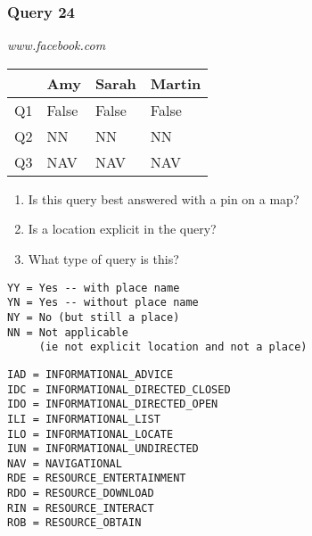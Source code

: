 \begin{frame}[fragile]
\frametitle{Query 24}
\vspace{1em}

\emph{www.facebook.com}

\vfill

\begin{table}
  \centering
  \begin{tabular}{ l l l l }
    & \textbf{Amy} & \textbf{Sarah} & \textbf{Martin}\\
    \toprule
    Q1 & False & False & False\\
Q2 & NN & NN & NN\\
Q3 & NAV & NAV & NAV\\
    \bottomrule
  \end{tabular}
\end{table}

\vfill

\tiny{

\begin{enumerate}
\item Is this query best answered with a pin on a map?
\item Is a location explicit in the query?
\item What type of query is this?
\end{enumerate}

\vfill

\begin{multicols}{2}
\begin{verbatim}
YY = Yes -- with place name
YN = Yes -- without place name
NY = No (but still a place)
NN = Not applicable 
     (ie not explicit location and not a place)
\end{verbatim}

\columnbreak
\begin{verbatim}
IAD = INFORMATIONAL_ADVICE
IDC = INFORMATIONAL_DIRECTED_CLOSED
IDO = INFORMATIONAL_DIRECTED_OPEN
ILI = INFORMATIONAL_LIST
ILO = INFORMATIONAL_LOCATE
IUN = INFORMATIONAL_UNDIRECTED
NAV = NAVIGATIONAL
RDE = RESOURCE_ENTERTAINMENT
RDO = RESOURCE_DOWNLOAD
RIN = RESOURCE_INTERACT
ROB = RESOURCE_OBTAIN
\end{verbatim}
\end{multicols}
}

\end{frame}


